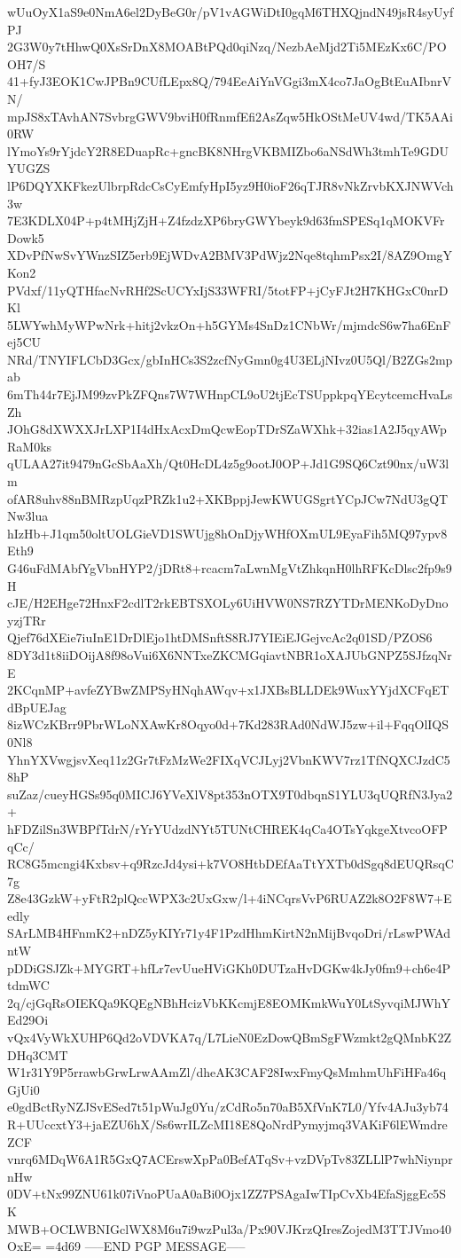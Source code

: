wUuOyX1aS9e0NmA6el2DyBeG0r/pV1vAGWiDtI0gqM6THXQjndN49jsR4syUyfPJ
2G3W0y7tHhwQ0XsSrDnX8MOABtPQd0qiNzq/NezbAeMjd2Ti5MEzKx6C/POOH7/S
41+fyJ3EOK1CwJPBn9CUfLEpx8Q/794EeAiYnVGgi3mX4co7JaOgBtEuAIbnrVN/
mpJS8xTAvhAN7SvbrgGWV9bviH0fRnmfEfi2AsZqw5HkOStMeUV4wd/TK5AAi0RW
lYmoYs9rYjdcY2R8EDuapRc+gncBK8NHrgVKBMIZbo6aNSdWh3tmhTe9GDUYUGZS
lP6DQYXKFkezUlbrpRdcCsCyEmfyHpI5yz9H0ioF26qTJR8vNkZrvbKXJNWVch3w
7E3KDLX04P+p4tMHjZjH+Z4fzdzXP6bryGWYbeyk9d63fmSPESq1qMOKVFrDowk5
XDvPfNwSvYWnzSIZ5erb9EjWDvA2BMV3PdWjz2Nqe8tqhmPsx2I/8AZ9OmgYKon2
PVdxf/11yQTHfacNvRHf2ScUCYxIjS33WFRI/5totFP+jCyFJt2H7KHGxC0nrDKl
5LWYwhMyWPwNrk+hitj2vkzOn+h5GYMs4SnDz1CNbWr/mjmdcS6w7ha6EnFej5CU
NRd/TNYIFLCbD3Gcx/gbInHCs3S2zcfNyGmn0g4U3ELjNIvz0U5Ql/B2ZGs2mpab
6mTh44r7EjJM99zvPkZFQns7W7WHnpCL9oU2tjEcTSUppkpqYEcytcemcHvaLsZh
JOhG8dXWXXJrLXP1I4dHxAcxDmQcwEopTDrSZaWXhk+32ias1A2J5qyAWpRaM0ks
qULAA27it9479nGcSbAaXh/Qt0HcDL4z5g9ootJ0OP+Jd1G9SQ6Czt90nx/uW3lm
ofAR8uhv88nBMRzpUqzPRZk1u2+XKBppjJewKWUGSgrtYCpJCw7NdU3gQTNw3lua
hIzHb+J1qm50oltUOLGieVD1SWUjg8hOnDjyWHfOXmUL9EyaFih5MQ97ypv8Eth9
G46uFdMAbfYgVbnHYP2/jDRt8+rcacm7aLwnMgVtZhkqnH0lhRFKcDlsc2fp9s9H
cJE/H2EHge72HnxF2cdlT2rkEBTSXOLy6UiHVW0NS7RZYTDrMENKoDyDnoyzjTRr
Qjef76dXEie7iuInE1DrDlEjo1htDMSnftS8RJ7YIEiEJGejvcAc2q01SD/PZOS6
8DY3d1t8iiDOijA8f98oVui6X6NNTxeZKCMGqiavtNBR1oXAJUbGNPZ5SJfzqNrE
2KCqnMP+avfeZYBwZMPSyHNqhAWqv+x1JXBsBLLDEk9WuxYYjdXCFqETdBpUEJag
8izWCzKBrr9PbrWLoNXAwKr8Oqyo0d+7Kd283RAd0NdWJ5zw+il+FqqOlIQS0Nl8
YhnYXVwgjsvXeq11z2Gr7tFzMzWe2FIXqVCJLyj2VbnKWV7rz1TfNQXCJzdC58hP
suZaz/cueyHGSs95q0MICJ6YVeXlV8pt353nOTX9T0dbqnS1YLU3qUQRfN3Jya2+
hFDZilSn3WBPfTdrN/rYrYUdzdNYt5TUNtCHREK4qCa4OTsYqkgeXtvcoOFPqCc/
RC8G5mcngi4Kxbsv+q9RzcJd4ysi+k7VO8HtbDEfAaTtYXTb0dSgq8dEUQRsqC7g
Z8e43GzkW+yFtR2plQccWPX3c2UxGxw/l+4iNCqrsVvP6RUAZ2k8O2F8W7+Eedly
SArLMB4HFnmK2+nDZ5yKIYr71y4F1PzdHhmKirtN2nMijBvqoDri/rLswPWAdntW
pDDiGSJZk+MYGRT+hfLr7evUueHViGKh0DUTzaHvDGKw4kJy0fm9+ch6e4PtdmWC
2q/cjGqRsOIEKQa9KQEgNBhHcizVbKKcmjE8EOMKmkWuY0LtSyvqiMJWhYEd29Oi
vQx4VyWkXUHP6Qd2oVDVKA7q/L7LieN0EzDowQBmSgFWzmkt2gQMnbK2ZDHq3CMT
W1r31Y9P5rrawbGrwLrwAAmZl/dheAK3CAF28IwxFmyQsMmhmUhFiHFa46qGjUi0
e0gdBctRyNZJSvESed7t51pWuJg0Yu/zCdRo5n70aB5XfVnK7L0/Yfv4AJu3yb74
R+UUccxtY3+jaEZU6hX/Ss6wrILZcMI18E8QoNrdPymyjmq3VAKiF6lEWmdreZCF
vnrq6MDqW6A1R5GxQ7ACErswXpPa0BefATqSv+vzDVpTv83ZLLlP7whNiynprnHw
0DV+tNx99ZNU61k07iVnoPUaA0aBi0Ojx1ZZ7PSAgaIwTIpCvXb4EfaSjggEc5SK
MWB+OCLWBNIGclWX8M6u7i9wzPul3a/Px90VJKrzQIresZojedM3TTJVmo40OxE=
=4d69
-----END PGP MESSAGE-----
